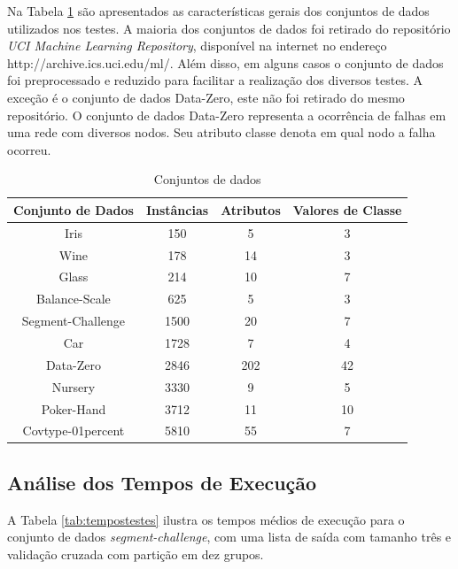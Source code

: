 Na Tabela \ref{tab:datasets} são apresentados as características gerais dos conjuntos de dados utilizados nos testes.
A maioria dos conjuntos de dados foi retirado do repositório \textit{UCI Machine Learning Repository}, disponível na internet no endereço http://archive.ics.uci.edu/ml/.
Além disso, em alguns casos o conjunto de dados foi preprocessado e reduzido para facilitar a realização dos diversos testes.
A exceção é o conjunto de dados Data-Zero, este não foi retirado do mesmo repositório.
O conjunto de dados Data-Zero representa a ocorrência de falhas em uma rede com diversos nodos.
Seu atributo classe denota em qual nodo a falha ocorreu.

\begin{table}[h!]
  \begin{center}
    \begin{tabular}{cccc}
      \hline
      \textbf{Conjunto de Dados} & \textbf{Instâncias} & \textbf{Atributos} & \textbf{Valores de Classe} \\
      \hline

      Iris & 150 & 5 & 3 \\
      Wine & 178 & 14 & 3 \\ 
      Glass & 214 & 10 & 7 \\
      Balance-Scale & 625 & 5 & 3 \\
      Segment-Challenge & 1500 & 20 & 7 \\
      Car & 1728 & 7 & 4 \\
      Data-Zero & 2846 & 202 & 42 \\
      Nursery & 3330 & 9 & 5 \\
      Poker-Hand & 3712 & 11 & 10 \\      
      Covtype-01percent & 5810 & 55 & 7 \\

      \hline
    \end{tabular}
    \caption{Conjuntos de dados}
    \label{tab:datasets}
  \end{center}
\end{table}

\subsection{Análise dos Tempos de Execução}

A Tabela \ref{tab:tempostestes} ilustra os tempos médios de execução para o conjunto de dados \textit{segment-challenge}, com uma lista de saída com tamanho três e validação cruzada com partição em dez grupos.


